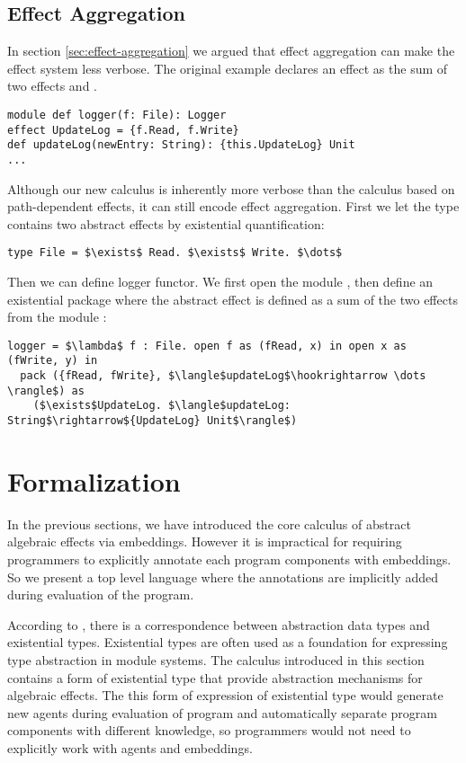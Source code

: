 \subsection{Effect Aggregation}
In section \ref{sec:effect-aggregation} we argued that effect aggregation can make the effect system less verbose. The original example declares an effect  as the sum of two effects  and . 
\begin{lstlisting}[xleftmargin=-5pt, numbers=none]
module def logger(f: File): Logger
effect UpdateLog = {f.Read, f.Write}
def updateLog(newEntry: String): {this.UpdateLog} Unit
...
\end{lstlisting}
Although our new calculus is inherently more verbose than the calculus based on path-dependent effects, it can still encode effect aggregation. First we let the  type contains two abstract effects by existential quantification:
\begin{lstlisting}[mathescape=true]
type File = $\exists$ Read. $\exists$ Write. $\dots$
\end{lstlisting}
Then we can define logger functor. We first open the module , then define an existential package where the abstract effect is defined as a sum of the two effects from the module :
\begin{lstlisting}[mathescape=true]
logger = $\lambda$ f : File. open f as (fRead, x) in open x as (fWrite, y) in 
  pack ({fRead, fWrite}, $\langle$updateLog$\hookrightarrow \dots \rangle$) as 
    ($\exists$UpdateLog. $\langle$updateLog: String$\rightarrow${UpdateLog} Unit$\rangle$)
\end{lstlisting}





\section{Formalization}
\label{sec-exist}
In the previous sections, we have introduced the core calculus of abstract algebraic effects via embeddings. However it is  impractical for requiring programmers to explicitly annotate each program components with embeddings. So we present a top level language where the annotations are implicitly added during evaluation of the program.  

According to \citet{mitchell88}, there is a correspondence between abstraction data types and existential types. Existential types are often used as a foundation for expressing type abstraction in module systems. The  calculus introduced in this section contains a form of existential type that provide abstraction mechanisms for algebraic effects. The this form of expression of existential type would generate new agents during evaluation of program and automatically separate program components with different knowledge, so programmers would not need to explicitly work with agents and embeddings.



